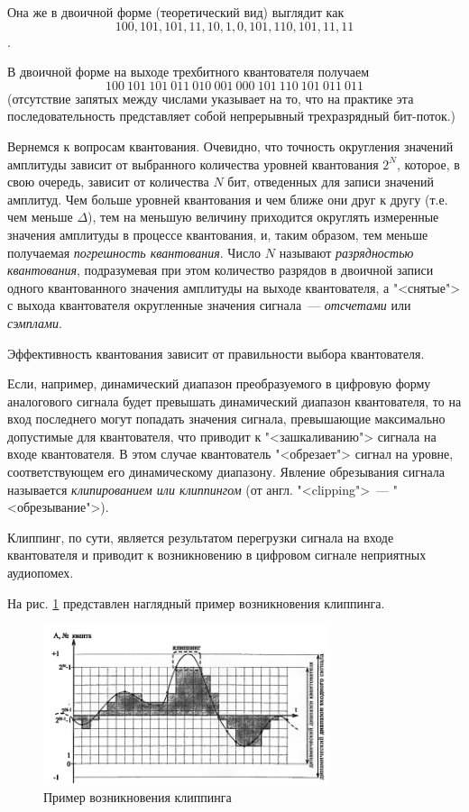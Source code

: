 \documentclass[oneside, final, 14pt]{extreport}
\begin{document}
Она же в двоичной форме (теоретический вид) выглядит как
\[100, 101, 101, 11, 10, 1, 0, 101, 110, 101, 11, 11\].

В двоичной форме на выходе трехбитного квантователя получаем
\[100~101~101~011~010~001~000~101~110~101~011~011\]
(отсутствие запятых между числами указывает на то, что на практике эта последовательность представляет собой непрерывный трехразрядный бит-поток.)

Вернемся к вопросам квантования. Очевидно, что точность округления значений амплитуды зависит от выбранного количества уровней квантования $2^N$, которое, в свою очередь, зависит от количества $N$ бит, отведенных для записи значений амплитуд. Чем больше уровней квантования и чем ближе они друг к другу (т.е. чем меньше $\Delta$), тем на меньшую величину приходится округлять измеренные значения амплитуды в процессе квантования, и, таким образом, тем меньше получаемая \textit{погрешность квантования}. Число $N$ называют \textit{разрядностью квантования}, подразумевая при этом количество разрядов в двоичной записи одного квантованного значения амплитуды на выходе квантователя, а "<снятые"> с выхода квантователя округленные значения сигнала~--- \textit{отсчетами} или \textit{сэмплами}.

Эффективность квантования зависит от правильности выбора квантователя.

Если, например, динамический диапазон преобразуемого в цифровую форму аналогового сигнала будет превышать динамический диапазон квантователя, то на вход последнего могут попадать значения сигнала, превышающие максимально допустимые для квантователя, что приводит к "<зашкаливанию"> сигнала на входе квантователя. В этом случае квантователь "<обрезает"> сигнал на уровне, соответствующем его динамическому диапазону. Явление обрезывания сигнала называется \textit{клипированием или клиппингом} (от англ. "<clipping">~--- "<обрезывание">). 

Клиппинг, по сути, является результатом перегрузки сигнала на входе квантователя и приводит к возникновению в цифровом сигнале неприятных аудиопомех. 

На рис. \ref{pic-digital-05} представлен наглядный пример возникновения клиппинга.

\begin{figure}[h]
\centering
\includegraphics[width=0.75\textwidth]{pic-digital-05}
\caption{Пример возникновения клиппинга}
\label{pic-digital-05}
\end{figure}
\end{document}
